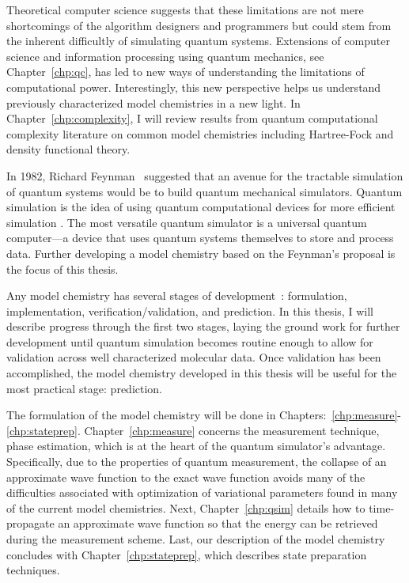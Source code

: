\documentclass[11pt,oneside,final]{huthesis}%
\begin{document}
Theoretical computer science suggests that these limitations are not mere shortcomings of the algorithm designers and programmers but could stem from the inherent difficultly of simulating quantum systems. Extensions of computer science and information processing using quantum mechanics, see Chapter~\ref{chp:qc}, has led to new ways of understanding the limitations of computational power.  Interestingly, this new perspective helps us understand previously characterized model chemistries in a new light.  In Chapter~\ref{chp:complexity}, I will review results from quantum computational complexity literature on common model chemistries including Hartree-Fock and density functional theory.

In 1982, Richard Feynman~\cite{Feynman82} suggested that an avenue for the
tractable simulation of quantum systems would be to build
quantum mechanical simulators. 
Quantum simulation is the idea of using quantum computational devices for more efficient simulation \cite{Feynman82,Lloyd96}.
The most versatile quantum simulator
is a universal quantum computer---a device that uses quantum
systems themselves to store and process data. 
Further developing a model chemistry based on the Feynman's proposal is the focus of this thesis.

Any model chemistry has several stages of development~\cite{Pople98}:  formulation, implementation, verification/validation, and prediction.  In this thesis, I will describe progress through the first two stages, laying the ground work for further development until quantum simulation becomes routine enough to allow for validation across well characterized molecular data.  Once validation has been accomplished, the model chemistry developed in this thesis will be useful for the most practical stage: prediction.  

The formulation of the model chemistry will be done in Chapters:~\ref{chp:measure}-\ref{chp:stateprep}.  Chapter~\ref{chp:measure} concerns the measurement technique, phase estimation, which is at the heart of the quantum simulator's advantage.  Specifically, due to the properties of quantum measurement, the collapse of an approximate wave function to the exact wave function avoids many of the difficulties associated with optimization of variational parameters found in many of the current model chemistries.  Next, Chapter~\ref{chp:qsim} details how to time-propagate an approximate wave function so that the energy can be retrieved during the measurement scheme.  Last, our description of the model chemistry concludes with Chapter~\ref{chp:stateprep}, which describes state preparation techniques.
\end{document}

